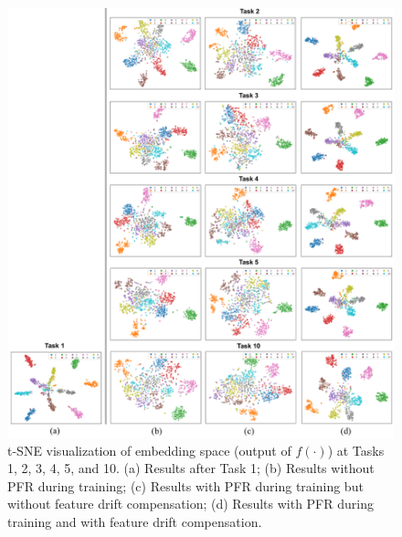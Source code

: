 \documentclass[twocolumn]{svjour3}          %
\begin{document}
\begin{figure}[h]
\begin{center}
\includegraphics[scale=0.4]{images/Embedding_tag.pdf}
\end{center}
\caption{t-SNE visualization of embedding space (output of $f(\cdot)$) at Tasks 1, 2, 3, 4, 5, and 10. (a) Results after Task 1; (b) Results without PFR during training; (c) Results with PFR during training but without feature drift compensation; (d) Results with PFR during training and with feature drift compensation.}
\label{fig:embedding_tag}
\end{figure}
\end{document}
